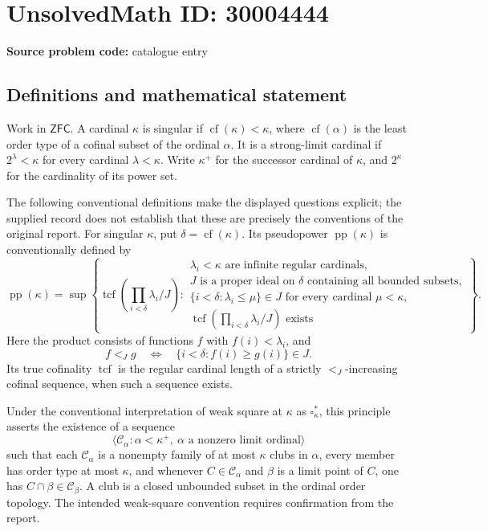 \documentclass[11pt]{article}
\begin{document}
\section*{UnsolvedMath ID: 30004444}
\textbf{Source problem code:} catalogue entry
\subsection{Definitions and mathematical statement}
Work in \(\mathsf{ZFC}\). A cardinal \(\kappa\) is singular if \(\operatorname{cf}(\kappa)<\kappa\), where \(\operatorname{cf}(\alpha)\) is the least order type of a cofinal subset of the ordinal \(\alpha\). It is a strong-limit cardinal if \(2^\lambda<\kappa\) for every cardinal \(\lambda<\kappa\). Write \(\kappa^+\) for the successor cardinal of \(\kappa\), and \(2^\kappa\) for the cardinality of its power set.

The following conventional definitions make the displayed questions explicit; the supplied record does not establish that these are precisely the conventions of the original report. For singular \(\kappa\), put \(\delta=\operatorname{cf}(\kappa)\). Its pseudopower \(\operatorname{pp}(\kappa)\) is conventionally defined by
\[
\operatorname{pp}(\kappa)=\sup\left\{\operatorname{tcf}\left(\prod_{i<\delta}\lambda_i/J\right):\begin{array}{l}
\lambda_i<\kappa\text{ are infinite regular cardinals},\\
J\text{ is a proper ideal on }\delta\text{ containing all bounded subsets},\\
\{i<\delta:\lambda_i\leq\mu\}\in J\text{ for every cardinal }\mu<\kappa,\\
\operatorname{tcf}\left(\prod_{i<\delta}\lambda_i/J\right)\text{ exists}
\end{array}\right\}.
\]
Here the product consists of functions \(f\) with \(f(i)<\lambda_i\), and
\[
f<_J g\quad\Longleftrightarrow\quad\{i<\delta:f(i)\geq g(i)\}\in J.
\]
Its true cofinality \(\operatorname{tcf}\) is the regular cardinal length of a strictly \(<_J\)-increasing cofinal sequence, when such a sequence exists.

Under the conventional interpretation of weak square at \(\kappa\) as \(\square_\kappa^*\), this principle asserts the existence of a sequence
\[
\langle\mathcal C_\alpha:\alpha<\kappa^+,\ \alpha\text{ a nonzero limit ordinal}\rangle
\]
such that each \(\mathcal C_\alpha\) is a nonempty family of at most \(\kappa\) clubs in \(\alpha\), every member has order type at most \(\kappa\), and whenever \(C\in\mathcal C_\alpha\) and \(\beta\) is a limit point of \(C\), one has \(C\cap\beta\in\mathcal C_\beta\). A club is a closed unbounded subset in the ordinal order topology. The intended weak-square convention requires confirmation from the report.
\end{document}
